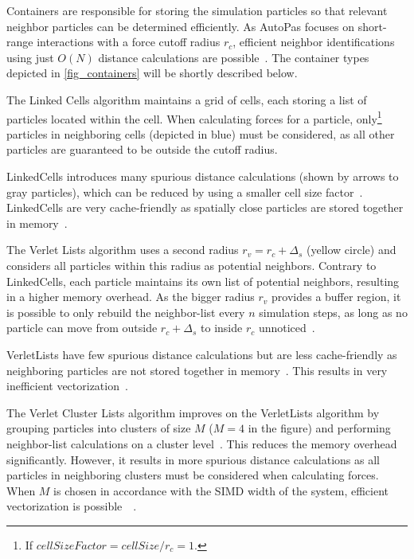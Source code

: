 \documentclass[conference]{IEEEtran}
\begin{document}
\begin{description}[style=nextline]
    \item[Container]
        Containers are responsible for storing the simulation particles so that relevant neighbor particles can be determined efficiently. As AutoPas focuses on short-range interactions with a force cutoff radius $r_c$, efficient neighbor identifications using just $O(N)$ distance calculations are possible~\cite{Gratl2019AutoPas}. The container types depicted in \autoref{fig_containers} will be shortly described below.

        \begin{description}[style=nextline, font=\itshape]
            \item[$\bullet$ Linked Cells]
                The Linked Cells algorithm maintains a grid of cells, each storing a list of particles located within the cell. When calculating forces for a particle, only\footnote{If $cellSizeFactor = {cellSize}/{r_c} = 1$.} particles in neighboring cells (depicted in blue) must be considered, as all other particles are guaranteed to be outside the cutoff radius.

                LinkedCells introduces many spurious distance calculations (shown by arrows to gray particles), which can be reduced by using a smaller cell size factor~\cite{menges2019}. LinkedCells are very cache-friendly as spatially close particles are stored together in memory~\cite{Gratl2022AutoPas}.

            \item[$\bullet$ Verlet Lists]
                The Verlet Lists algorithm uses a second radius $r_v = {r_c} + \Delta_s$ (yellow circle) and considers all particles within this radius as potential neighbors. Contrary to LinkedCells, each particle maintains its own list of potential neighbors, resulting in a higher memory overhead.
                As the bigger radius $r_v$ provides a buffer region, it is possible to only rebuild the neighbor-list every $n$ simulation steps, as long as no particle can move from outside $r_c + \Delta_s$ to inside $r_c$ unnoticed~\cite{NEWCOME2023115278}.

                VerletLists have few spurious distance calculations but are less cache-friendly as neighboring particles are not stored together in memory~\cite{Gratl2022AutoPas}. This results in very inefficient vectorization~\cite{PALL20132641}.

            \item[$\bullet$ Verlet Cluster Lists]
                The Verlet Cluster Lists algorithm improves on the VerletLists algorithm by grouping particles into clusters of size $M$ ($M=4$ in the figure) and performing neighbor-list calculations on a cluster level~\cite{PALL20132641}. This reduces the memory overhead significantly. However, it results in more spurious distance calculations as all particles in neighboring clusters must be considered when calculating forces. When $M$ is chosen in accordance with the SIMD width of the system, efficient vectorization is possible~\cite{Gratl2022AutoPas}~\cite{PALL20132641}.
        \end{description}


\end{description}
\end{document}
